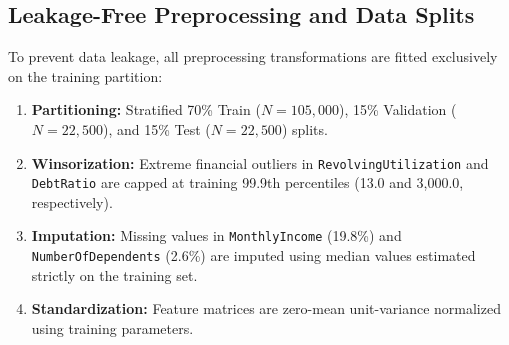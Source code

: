\documentclass[conference]{IEEEtran}
\begin{document}
\begin{table}[htbp]
\caption{Dataset Feature Characteristics and Domain Definitions}
\label{tab:dataset}
\centering
{}
\end{table}

\subsection{Leakage-Free Preprocessing and Data Splits}
To prevent data leakage, all preprocessing transformations are fitted exclusively on the training partition:
\begin{enumerate}
    \item \textbf{Partitioning:} Stratified 70\% Train ($N=105,000$), 15\% Validation ($N=22,500$), and 15\% Test ($N=22,500$) splits.
    \item \textbf{Winsorization:} Extreme financial outliers in \texttt{RevolvingUtilization} and \texttt{DebtRatio} are capped at training 99.9th percentiles (13.0 and 3,000.0, respectively).
    \item \textbf{Imputation:} Missing values in \texttt{MonthlyIncome} (19.8\%) and \texttt{NumberOfDependents} (2.6\%) are imputed using median values estimated strictly on the training set.
    \item \textbf{Standardization:} Feature matrices are zero-mean unit-variance normalized using training parameters.
\end{enumerate}
\end{document}
